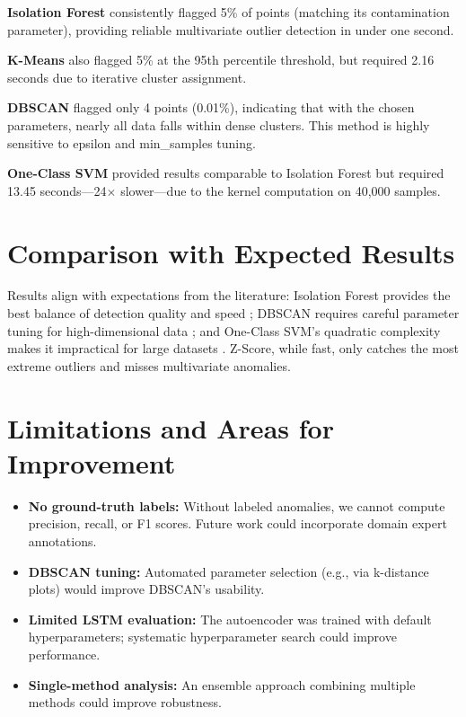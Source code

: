 \documentclass{CLS_zhou430}
\begin{document}
\textbf{Isolation Forest} consistently flagged 5\% of points (matching its contamination parameter), providing reliable multivariate outlier detection in under one second.

\textbf{K-Means} also flagged 5\% at the 95th percentile threshold, but required 2.16 seconds due to iterative cluster assignment.

\textbf{DBSCAN} flagged only 4 points (0.01\%), indicating that with the chosen parameters, nearly all data falls within dense clusters. This method is highly sensitive to epsilon and min\_samples tuning.

\textbf{One-Class SVM} provided results comparable to Isolation Forest but required 13.45 seconds---24$\times$ slower---due to the kernel computation on 40,000 samples.

\section{Comparison with Expected Results}
Results align with expectations from the literature: Isolation Forest provides the best balance of detection quality and speed \cite{liu2008isolation}; DBSCAN requires careful parameter tuning for high-dimensional data \cite{ester1996density}; and One-Class SVM's quadratic complexity makes it impractical for large datasets \cite{scholkopf2001estimating}. Z-Score, while fast, only catches the most extreme outliers and misses multivariate anomalies.

\section{Limitations and Areas for Improvement}
\begin{itemize}
    \item \textbf{No ground-truth labels:} Without labeled anomalies, we cannot compute precision, recall, or F1 scores. Future work could incorporate domain expert annotations.
    \item \textbf{DBSCAN tuning:} Automated parameter selection (e.g., via k-distance plots) would improve DBSCAN's usability.
    \item \textbf{Limited LSTM evaluation:} The autoencoder was trained with default hyperparameters; systematic hyperparameter search could improve performance.
    \item \textbf{Single-method analysis:} An ensemble approach combining multiple methods could improve robustness.
\end{itemize}
\end{document}
